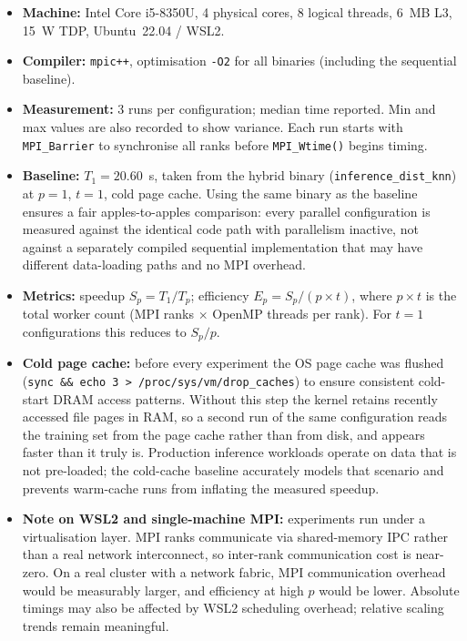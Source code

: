 \documentclass[12pt,a4paper]{article}
\begin{document}
\begin{itemize}
  \item \textbf{Machine:} Intel Core i5-8350U, 4 physical cores, 8 logical
        threads, 6~MB L3, 15~W TDP, Ubuntu~22.04 / WSL2.
  \item \textbf{Compiler:} \texttt{mpic++}, optimisation \texttt{-O2} for
        all binaries (including the sequential baseline).
  \item \textbf{Measurement:} 3 runs per configuration; median time reported.
        Min and max values are also recorded to show variance.
        Each run starts with \texttt{MPI\_Barrier} to synchronise all ranks
        before \texttt{MPI\_Wtime()} begins timing.
  \item \textbf{Baseline:} $T_1 = 20.60$~s, taken from the hybrid binary
        (\texttt{inference\_dist\_knn}) at $p=1$, $t=1$, cold page cache.
        Using the same binary as the baseline ensures a fair apples-to-apples
        comparison: every parallel configuration is measured against the
        identical code path with parallelism inactive, not against a
        separately compiled sequential implementation that may have different
        data-loading paths and no MPI overhead.
  \item \textbf{Metrics:} speedup $S_p = T_1 / T_p$; efficiency
        $E_p = S_p / (p \times t)$, where $p \times t$ is the total worker
        count (MPI ranks $\times$ OpenMP threads per rank). For $t=1$
        configurations this reduces to $S_p / p$.
  \item \textbf{Cold page cache:} before every experiment the OS page cache
        was flushed (\texttt{sync \&\& echo 3 > /proc/sys/vm/drop\_caches})
        to ensure consistent cold-start DRAM access patterns. Without this
        step the kernel retains recently accessed file pages in RAM, so a
        second run of the same configuration reads the training set from
        the page cache rather than from disk, and appears faster than it
        truly is. Production inference workloads operate on data that is
        not pre-loaded; the cold-cache baseline accurately models that
        scenario and prevents warm-cache runs from inflating the measured
        speedup.
  \item \textbf{Note on WSL2 and single-machine MPI:} experiments run under
        a virtualisation layer. MPI ranks communicate via shared-memory IPC
        rather than a real network interconnect, so inter-rank communication
        cost is near-zero. On a real cluster with a network fabric, MPI
        communication overhead would be measurably larger, and efficiency
        at high $p$ would be lower. Absolute timings may also be affected
        by WSL2 scheduling overhead; relative scaling trends remain
        meaningful.
\end{itemize}
\end{document}
